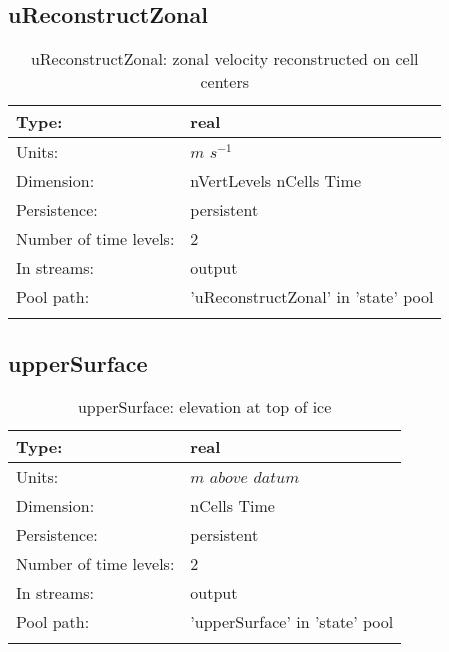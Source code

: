 \subsection[uReconstructZonal]{uReconstructZonal}
\label{subsec:var_sec_state_uReconstructZonal}
\begin{center}
\begin{longtable}{| p{2.0in} | p{4.0in} |}
        \hline 
        Type: & real \\
        \hline 
        Units: & $m$ $s^{-1}$ \\
        \hline 
        Dimension: & nVertLevels nCells Time \\
        \hline 
        Persistence: & persistent \\
        \hline 
        Number of time levels: & 2 \\
        \hline 
		 In streams: &  output \\
        \hline 
            Pool path: & 'uReconstructZonal' in 'state' pool
 \\
		 \hline 
    \caption{uReconstructZonal: zonal velocity reconstructed on cell centers}
\end{longtable}
\end{center}
\subsection[upperSurface]{upperSurface}
\label{subsec:var_sec_state_upperSurface}
\begin{center}
\begin{longtable}{| p{2.0in} | p{4.0in} |}
        \hline 
        Type: & real \\
        \hline 
        Units: & $m$ $above$ $datum$ \\
        \hline 
        Dimension: & nCells Time \\
        \hline 
        Persistence: & persistent \\
        \hline 
        Number of time levels: & 2 \\
        \hline 
		 In streams: &  output \\
        \hline 
            Pool path: & 'upperSurface' in 'state' pool
 \\
		 \hline 
    \caption{upperSurface: elevation at top of ice}
\end{longtable}
\end{center}
